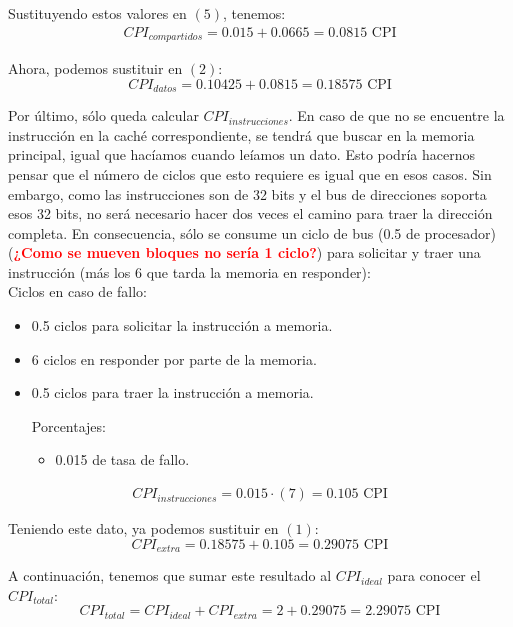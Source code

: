 \documentclass[12pt,a4paper]{article}
\begin{document}
Sustituyendo estos valores en $(5)$, tenemos:
\begin{align*}
CPI_{compartidos}=0.015+0.0665=0.0815 \text{ CPI}
\end{align*}

Ahora, podemos sustituir en $(2)$:
\begin{equation*}
CPI_{datos}=0.10425+0.0815=0.18575\text{ CPI}
\end{equation*}

Por último, sólo queda calcular $CPI_{instrucciones}$. En caso de que no se encuentre la instrucción en la caché correspondiente, se tendrá que buscar en la memoria principal, igual que hacíamos cuando leíamos un dato. Esto podría hacernos pensar que el número de ciclos que esto requiere es igual que en esos casos. Sin embargo, como las instrucciones son de 32 bits y el bus de direcciones soporta esos 32 bits, no será necesario hacer dos veces el camino para traer la dirección completa. En consecuencia, sólo se consume un ciclo de bus (0.5 de procesador)(\textbf{\textcolor{red}{¿Como se mueven bloques no sería 1 ciclo?}}) para solicitar y traer una instrucción (más los 6 que tarda la memoria en responder):\\

Ciclos en caso de fallo:
\begin{itemize}
\item 0.5 ciclos para solicitar la instrucción a memoria.
\item 6 ciclos en responder por parte de la memoria.
\item 0.5 ciclos para traer la instrucción a memoria.

Porcentajes:
\begin{itemize}
\item 0.015 de tasa de fallo.
\end{itemize}
\end{itemize}
\begin{align*}
CPI_{instrucciones}=0.015\cdot (7)=0.105 \text{ CPI}
\end{align*}

Teniendo este dato, ya podemos sustituir en $(1)$:
\begin{equation*}
CPI_{extra}=0.18575+0.105=0.29075\text{ CPI}
\end{equation*}

A continuación, tenemos que sumar este resultado al $CPI_{ideal}$ para conocer el $CPI_{total}$:
\begin{equation*}
CPI_{total}=CPI_{ideal}+CPI_{extra}=2+0.29075=2.29075\text{ CPI}
\end{equation*}
\end{document}

